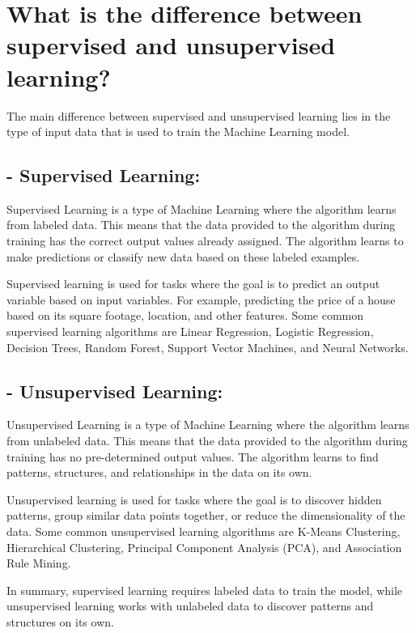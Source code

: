 \section{What is the difference between supervised and unsupervised learning?}
The main difference between supervised and unsupervised learning lies in the type of input data that is used to train the Machine Learning model.

\subsection{- Supervised Learning:}
Supervised Learning is a type of Machine Learning where the algorithm learns from labeled data. This means that the data provided to the algorithm during training has the correct output values already assigned. The algorithm learns to make predictions or classify new data based on these labeled examples.

Supervised learning is used for tasks where the goal is to predict an output variable based on input variables. For example, predicting the price of a house based on its square footage, location, and other features. Some common supervised learning algorithms are Linear Regression, Logistic Regression, Decision Trees, Random Forest, Support Vector Machines, and Neural Networks.

\subsection{- Unsupervised Learning:}
Unsupervised Learning is a type of Machine Learning where the algorithm learns from unlabeled data. This means that the data provided to the algorithm during training has no pre-determined output values. The algorithm learns to find patterns, structures, and relationships in the data on its own.

Unsupervised learning is used for tasks where the goal is to discover hidden patterns, group similar data points together, or reduce the dimensionality of the data. Some common unsupervised learning algorithms are K-Means Clustering, Hierarchical Clustering, Principal Component Analysis (PCA), and Association Rule Mining.

In summary, supervised learning requires labeled data to train the model, while unsupervised learning works with unlabeled data to discover patterns and structures on its own.

